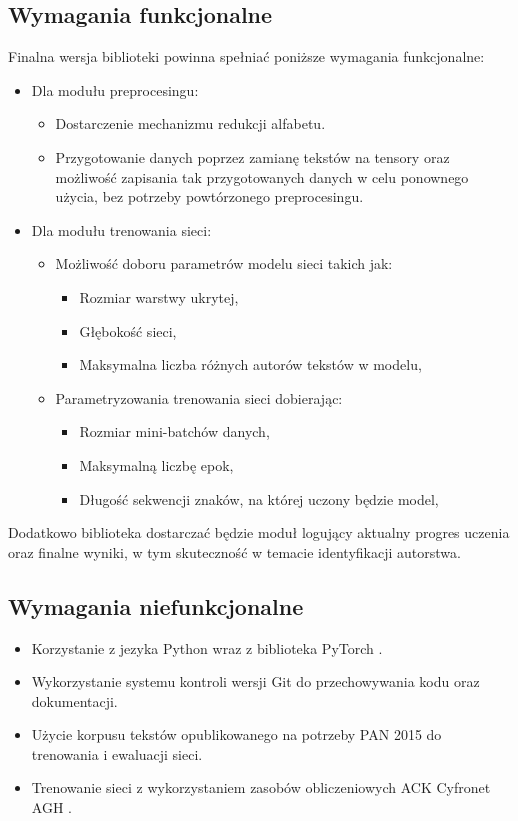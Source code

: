 \subsection{Wymagania funkcjonalne}
Finalna wersja biblioteki powinna spełniać poniższe wymagania funkcjonalne:
\begin{itemize}
 	\item Dla modułu preprocesingu:
	    \begin{itemize}
		    \item Dostarczenie mechanizmu redukcji alfabetu.
		    \item Przygotowanie danych poprzez zamianę tekstów na tensory oraz możliwość 
				zapisania tak przygotowanych danych w celu ponownego użycia, bez potrzeby
				powtórzonego preprocesingu. 
	    \end{itemize}
 	\item Dla modułu trenowania sieci:
		\begin{itemize}
			\item Możliwość doboru parametrów modelu sieci takich jak:
				\begin{itemize}
			    	\item Rozmiar warstwy ukrytej,
			    	\item Głębokość sieci,
			    	\item Maksymalna liczba różnych autorów tekstów w modelu,
		    	\end{itemize}
			\item Parametryzowania trenowania sieci dobierając:
				\begin{itemize}
			    	\item Rozmiar mini-batchów danych,
			    	\item Maksymalną liczbę epok,
			    	\item Długość sekwencji znaków, na której uczony będzie model,
		    	\end{itemize}
		  \end{itemize}
\end{itemize}
Dodatkowo biblioteka dostarczać będzie moduł logujący aktualny progres uczenia 
oraz finalne wyniki, w tym skuteczność w temacie identyfikacji autorstwa.	

\subsection{Wymagania niefunkcjonalne}
\begin{itemize}
 	\item Korzystanie z jezyka Python wraz z biblioteka PyTorch \cite{pytorch}.
 	\item Wykorzystanie systemu kontroli wersji Git do przechowywania kodu oraz dokumentacji.
 	\item Użycie korpusu tekstów opublikowanego na potrzeby PAN 2015 \cite{pan} do trenowania i ewaluacji sieci.
 	\item Trenowanie sieci z wykorzystaniem zasobów obliczeniowych ACK Cyfronet AGH \cite{plgrid}.
\end{itemize}
